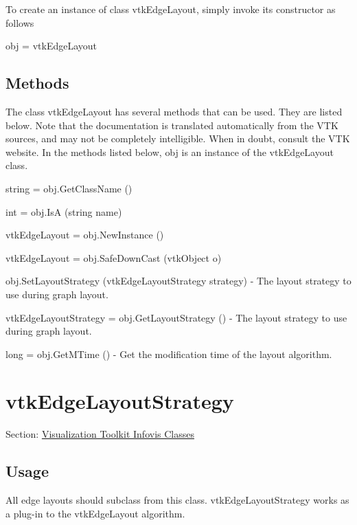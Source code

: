 To create an instance of class vtk\-Edge\-Layout, simply invoke its constructor as follows \begin{DoxyVerb}  obj = vtkEdgeLayout
\end{DoxyVerb}
 \hypertarget{vtkwidgets_vtkxyplotwidget_Methods}{}\subsection{Methods}\label{vtkwidgets_vtkxyplotwidget_Methods}
The class vtk\-Edge\-Layout has several methods that can be used. They are listed below. Note that the documentation is translated automatically from the V\-T\-K sources, and may not be completely intelligible. When in doubt, consult the V\-T\-K website. In the methods listed below, {\ttfamily obj} is an instance of the vtk\-Edge\-Layout class. 
\begin{DoxyItemize}
\item {\ttfamily string = obj.\-Get\-Class\-Name ()}  
\item {\ttfamily int = obj.\-Is\-A (string name)}  
\item {\ttfamily vtk\-Edge\-Layout = obj.\-New\-Instance ()}  
\item {\ttfamily vtk\-Edge\-Layout = obj.\-Safe\-Down\-Cast (vtk\-Object o)}  
\item {\ttfamily obj.\-Set\-Layout\-Strategy (vtk\-Edge\-Layout\-Strategy strategy)} -\/ The layout strategy to use during graph layout.  
\item {\ttfamily vtk\-Edge\-Layout\-Strategy = obj.\-Get\-Layout\-Strategy ()} -\/ The layout strategy to use during graph layout.  
\item {\ttfamily long = obj.\-Get\-M\-Time ()} -\/ Get the modification time of the layout algorithm.  
\end{DoxyItemize}\hypertarget{vtkinfovis_vtkedgelayoutstrategy}{}\section{vtk\-Edge\-Layout\-Strategy}\label{vtkinfovis_vtkedgelayoutstrategy}
Section\-: \hyperlink{sec_vtkinfovis}{Visualization Toolkit Infovis Classes} \hypertarget{vtkwidgets_vtkxyplotwidget_Usage}{}\subsection{Usage}\label{vtkwidgets_vtkxyplotwidget_Usage}
All edge layouts should subclass from this class. vtk\-Edge\-Layout\-Strategy works as a plug-\/in to the vtk\-Edge\-Layout algorithm.

